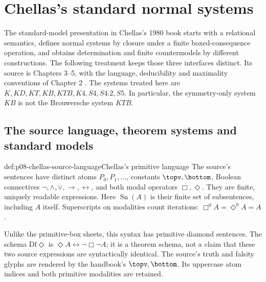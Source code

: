 \section{Chellas's standard normal systems}
\label{sec:p08-chellas-standard}

The standard-model presentation in Chellas's 1980 book starts with a
relational semantics, defines normal systems by closure under a finite
boxed-consequence operation, and obtains determination and finite
countermodels by different constructions. The following treatment keeps
those three interfaces distinct. Its source is Chapters 3--5, with the
language, deducibility and maximality conventions of Chapter 2
\cite[chs.~2--5]{Chellas1980}. The systems treated here are
\(K,KD,KT,KB,KTB,K4,S4,S4.2,S5\). In particular, the symmetry-only
system \(KB\) is not the Brouwersche system \(KTB\).

\subsection{The source language, theorem systems and standard models}

\begin{hbconvention}{def:p08-chellas-source-language}{Chellas's primitive language}
The source's sentences have distinct atoms \(P_0,P_1,\ldots\), constants
\(\topv,\bottom\), Boolean connectives
\(\neg,\land,\lor,\to,\leftrightarrow\), and both modal operators
\(\Box,\Diamond\). They are finite, uniquely readable expressions.
Here \(\operatorname{Sn}(A)\) is their finite set of subsentences,
including \(A\) itself. Superscripts on modalities count iterations:
\(\Box^0 A=\Diamond^0 A=A\).

Unlike the primitive-box sheets, this syntax has primitive diamond
sentences. The schema \(\mathrm{Df}\Diamond\) is
\(\Diamond A\leftrightarrow\neg\Box\neg A\); it is a theorem
schema, not a claim that these two source expressions are syntactically
identical. The source's truth and falsity glyphs are rendered by the
handbook's \(\topv,\bottom\). Its uppercase atom indices and both
primitive modalities are retained.
\end{hbconvention}

